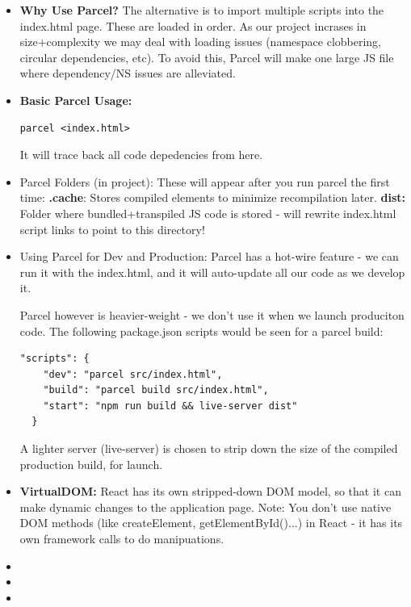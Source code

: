 \documentclass[8pt,a4paper]{extarticle}
\begin{document}
\begin{itemize}
\item \textbf{Why Use Parcel?} The alternative is to import multiple scripts into the index.html page. These are loaded in order. As our project incrases in size+complexity we may deal with loading issues (namespace clobbering, circular dependencies, etc). To avoid this, Parcel will make one large JS file where dependency/NS issues are alleviated.

\item \textbf{Basic Parcel Usage:}

\begin{verbatim}
parcel <index.html>
\end{verbatim}

It will trace back all code depedencies from here.
 
\item Parcel Folders (in project): These will appear after you run parcel the first time:
\mitem \textbf{.cache}: Stores compiled elements to minimize recompilation later.
\mitem \textbf{dist:} Folder where bundled+transpiled JS code is stored - will rewrite index.html script links to point to this directory!
\item Using Parcel for Dev and Production: Parcel has a hot-wire feature - we can run it with the index.html, and it will auto-update all our code as we develop it.

Parcel however is heavier-weight - we don't use it when we launch produciton code. The following package.json scripts would be seen for a parcel build:

\begin{verbatim}
"scripts": {
    "dev": "parcel src/index.html",
    "build": "parcel build src/index.html",
    "start": "npm run build && live-server dist"
  }
\end{verbatim}

A lighter server (live-server) is chosen to strip down the size of the compiled production build, for launch.

\item \textbf{VirtualDOM:} React has its own stripped-down DOM model, so that it can make dynamic changes to the application page. Note: You don't use native DOM methods (like createElement, getElementById()...) in React - it has its own framework calls to do manipuations.
\item
\item
\item

\end{itemize}
\end{document}
